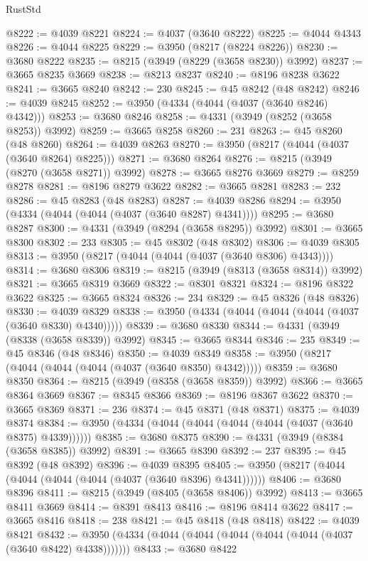 \begin{lexlean}{RustStd}
\begin{coremodule}
@8222 := @4039 @8221
@8224 := @4037 (@3640 @8222)
@8225 := @4044 @4343
@8226 := @4044 @8225
@8229 := @3950 (@8217 (@8224 @8226))
@8230 := @3680 @8222
@8235 := @8215 (@3949 (@8229 (@3658 @8230)) @3992)
@8237 := @3665 @8235 @3669
@8238 := @8213 @8237
@8240 := @8196 @8238 @3622
@8241 := @3665 @8240
@8242 := 230
@8245 := @45 @8242 (@48 @8242)
@8246 := @4039 @8245
@8252 := @3950 (@4334 (@4044 (@4037 (@3640 @8246) @4342)))
@8253 := @3680 @8246
@8258 := @4331 (@3949 (@8252 (@3658 @8253)) @3992)
@8259 := @3665 @8258
@8260 := 231
@8263 := @45 @8260 (@48 @8260)
@8264 := @4039 @8263
@8270 := @3950 (@8217 (@4044 (@4037 (@3640 @8264) @8225)))
@8271 := @3680 @8264
@8276 := @8215 (@3949 (@8270 (@3658 @8271)) @3992)
@8278 := @3665 @8276 @3669
@8279 := @8259 @8278
@8281 := @8196 @8279 @3622
@8282 := @3665 @8281
@8283 := 232
@8286 := @45 @8283 (@48 @8283)
@8287 := @4039 @8286
@8294 := @3950 (@4334 (@4044 (@4044 (@4037 (@3640 @8287) @4341))))
@8295 := @3680 @8287
@8300 := @4331 (@3949 (@8294 (@3658 @8295)) @3992)
@8301 := @3665 @8300
@8302 := 233
@8305 := @45 @8302 (@48 @8302)
@8306 := @4039 @8305
@8313 := @3950 (@8217 (@4044 (@4044 (@4037 (@3640 @8306) @4343))))
@8314 := @3680 @8306
@8319 := @8215 (@3949 (@8313 (@3658 @8314)) @3992)
@8321 := @3665 @8319 @3669
@8322 := @8301 @8321
@8324 := @8196 @8322 @3622
@8325 := @3665 @8324
@8326 := 234
@8329 := @45 @8326 (@48 @8326)
@8330 := @4039 @8329
@8338 := @3950 (@4334 (@4044 (@4044 (@4044 (@4037 (@3640 @8330) @4340)))))
@8339 := @3680 @8330
@8344 := @4331 (@3949 (@8338 (@3658 @8339)) @3992)
@8345 := @3665 @8344
@8346 := 235
@8349 := @45 @8346 (@48 @8346)
@8350 := @4039 @8349
@8358 := @3950 (@8217 (@4044 (@4044 (@4044 (@4037 (@3640 @8350) @4342)))))
@8359 := @3680 @8350
@8364 := @8215 (@3949 (@8358 (@3658 @8359)) @3992)
@8366 := @3665 @8364 @3669
@8367 := @8345 @8366
@8369 := @8196 @8367 @3622
@8370 := @3665 @8369
@8371 := 236
@8374 := @45 @8371 (@48 @8371)
@8375 := @4039 @8374
@8384 := @3950 (@4334 (@4044 (@4044 (@4044 (@4044 (@4037 (@3640 @8375) @4339))))))
@8385 := @3680 @8375
@8390 := @4331 (@3949 (@8384 (@3658 @8385)) @3992)
@8391 := @3665 @8390
@8392 := 237
@8395 := @45 @8392 (@48 @8392)
@8396 := @4039 @8395
@8405 := @3950 (@8217 (@4044 (@4044 (@4044 (@4044 (@4037 (@3640 @8396) @4341))))))
@8406 := @3680 @8396
@8411 := @8215 (@3949 (@8405 (@3658 @8406)) @3992)
@8413 := @3665 @8411 @3669
@8414 := @8391 @8413
@8416 := @8196 @8414 @3622
@8417 := @3665 @8416
@8418 := 238
@8421 := @45 @8418 (@48 @8418)
@8422 := @4039 @8421
@8432 := @3950 (@4334 (@4044 (@4044 (@4044 (@4044 (@4044 (@4037 (@3640 @8422) @4338)))))))
@8433 := @3680 @8422

\end{coremodule}
\end{lexlean}
